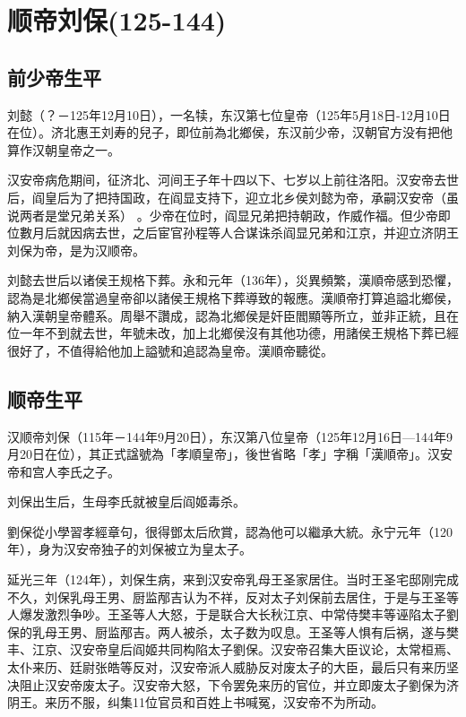 
\section{顺帝刘保\tiny(125-144)}

\subsection{前少帝生平}

刘懿（？－125年12月10日），一名犊，东汉第七位皇帝（125年5月18日-12月10日在位）。济北惠王刘寿的兒子，即位前為北鄉侯，东汉前少帝，汉朝官方没有把他算作汉朝皇帝之一。

汉安帝病危期间，征济北、河间王子年十四以下、七岁以上前往洛阳。汉安帝去世后，阎皇后为了把持国政，在阎显支持下，迎立北乡侯刘懿为帝，承嗣汉安帝（虽说两者是堂兄弟关系） 。少帝在位时，阎显兄弟把持朝政，作威作福。但少帝即位數月后就因病去世，之后宦官孙程等人合谋诛杀阎显兄弟和江京，并迎立济阴王刘保为帝，是为汉顺帝。

刘懿去世后以诸侯王规格下葬。永和元年（136年），災異頻繁，漢順帝感到恐懼，認為是北鄉侯當過皇帝卻以諸侯王規格下葬導致的報應。漢順帝打算追謚北鄉侯，納入漢朝皇帝體系。周舉不讚成，認為北鄉侯是奸臣閻顯等所立，並非正統，且在位一年不到就去世，年號未改，加上北鄉侯沒有其他功德，用諸侯王規格下葬已經很好了，不值得給他加上謚號和追認為皇帝。漢順帝聽從。

\subsection{顺帝生平}

汉顺帝刘保（115年－144年9月20日），东汉第八位皇帝（125年12月16日—144年9月20日在位），其正式諡號為「孝順皇帝」，後世省略「孝」字稱「漢順帝」。汉安帝和宫人李氏之子。

刘保出生后，生母李氏就被皇后阎姬毒杀。

劉保從小學習孝經章句，很得鄧太后欣賞，認為他可以繼承大統。永宁元年（120年），身为汉安帝独子的刘保被立为皇太子。

延光三年（124年），刘保生病，来到汉安帝乳母王圣家居住。当时王圣宅邸刚完成不久，刘保乳母王男、厨监邴吉认为不祥，反对太子刘保前去居住，于是与王圣等人爆发激烈争吵。王圣等人大怒，于是联合大长秋江京、中常侍樊丰等诬陷太子劉保的乳母王男、厨监邴吉。两人被杀，太子数为叹息。王圣等人惧有后祸，遂与樊丰、江京、汉安帝皇后阎姬共同构陷太子劉保。汉安帝召集大臣议论，太常桓焉、太仆来历、廷尉张皓等反对，汉安帝派人威胁反对废太子的大臣，最后只有来历坚决阻止汉安帝废太子。汉安帝大怒，下令罢免来历的官位，并立即废太子劉保为济阴王。来历不服，纠集11位官员和百姓上书喊冤，汉安帝不为所动。

